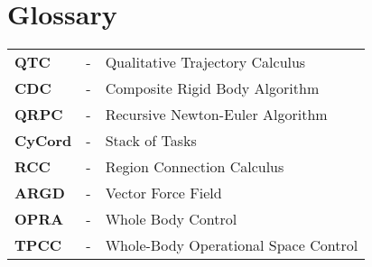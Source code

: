 \documentclass[rnd]{mas_report}
\newcommand\nomenclature[3]{#1 & #2 & #3 \\}
\begin{document}
\newpage
\chapter*{Glossary}
\begin{longtable}{@{}p{2.5cm}@{}p{1cm}@{}p{\dimexpr\textwidth-1cm\relax}@{}}
	\label{QTC}\nomenclature{\textbf{QTC}}{-}{Qualitative Trajectory Calculus }%
	\label{CDC}\nomenclature{\textbf{CDC}}{-}{Composite Rigid Body Algorithm}%
	\label{QRPC}\nomenclature{\textbf{QRPC}}{-}{Recursive Newton-Euler Algorithm}%
	\label{CyCord}\nomenclature{\textbf{CyCord}}{-}{Stack of Tasks}%
	\label{RCC}\nomenclature{\textbf{RCC}}{-}{Region Connection Calculus}%
	\label{ARGD}\nomenclature{\textbf{ARGD}}{-}{Vector Force Field}%
	\label{OPRA}\nomenclature{\textbf{OPRA}}{-}{Whole Body Control}%
	\label{TPCC}\nomenclature{\textbf{TPCC}}{-}{Whole-Body Operational Space Control}%
\end{longtable}

\tableofcontents
\listoffigures
\listoftables


\mainmatter %

\pagestyle{mainmatter}










%
%

\backmatter

\end{document}
